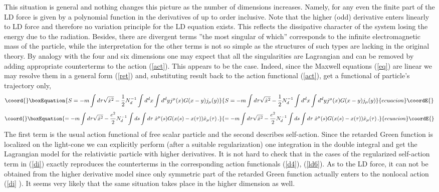 \documentclass[a4paper,12pt]{article}
\begin{document}
This situation is general and nothing changes this picture as the number of
dimensions increases. Namely, for any even \coordHE{} the finite part of the LD
force is given by a polynomial function in the derivatives of \coordHE{}
up to \coordHE{} order inclusive. Note that the higher (odd) derivative \coordHE{} enters linearly to LD force and therefore no variation
principle for the LD equation exists. This reflects the dissipative
character of the system losing the energy due to the radiation. Besides,
there are \coordHE{} divergent terms ''the most singular of which'' corresponds
to the infinite electromagnetic mass of the particle, while the
interpretation for the other terms is not so simple as the structures of
such types are lacking in the original theory. By analogy with the four and
six dimensions one may expect that all the singularities are Lagrangian and
can be removed by adding appropriate counterterms to the action (\ref{act}).
This appears to be the case. Indeed, since the Maxwell equations (\ref{eq})
are linear we may resolve them in a general form (\ref{ret}) and,
substituting result back to the action functional (\ref{act}), get a
functional of particle's trajectory only,
\begin{equation}\coord{}\boxEquation{
S=-m\int d\tau \sqrt{\dot x^2}-\frac 12N_d^{-1}\int d^dx\int d^dyj^\mu
(x)G(x-y)j_\mu (y)  \label{di}
}{
S=-m\int d\tau \sqrt{\dot x^2}-\frac 12N_d^{-1}\int d^dx\int d^dyj^\mu
(x)G(x-y)j_\mu (y)  }{ecuacion}\coordE{}\end{equation}
\begin{equation*}\coord{}\boxEquation{
=-m\int d\tau \sqrt{\dot x^2}-\frac{e^2}2N_d^{-1}\int ds\int d\tau \;\dot
x^\mu (s)G(x(s)-x(\tau ))\dot x_\mu (\tau )\,.
}{
=-m\int d\tau \sqrt{\dot x^2}-\frac{e^2}2N_d^{-1}\int ds\int d\tau \;\dot
x^\mu (s)G(x(s)-x(\tau ))\dot x_\mu (\tau )\,.
}{ecuacion}\coordE{}\end{equation*}
The first term is the usual action functional of free scalar particle and
the second describes self-action. Since the retarded Green function is
localized on the light-cone we can explicitly perform (after a suitable
regularization) one integration in the double integral and get the
Lagrangian model for the relativistic particle with higher derivatives. It is
not hard to check that in the cases of \coordHE{} the regularized self-action
term in (\ref{di}) exactly reproduces the counterterms in the corresponding
action functionals (\ref{d4}), (\ref{ld6}). As to the LD force, it can not
be obtained from the higher derivative model since only symmetric part of
the retarded Green function actually enters to the nonlocal action (\ref{di}%
). It seems very likely that the same situation takes place in the higher
dimension as well.
\end{document}
